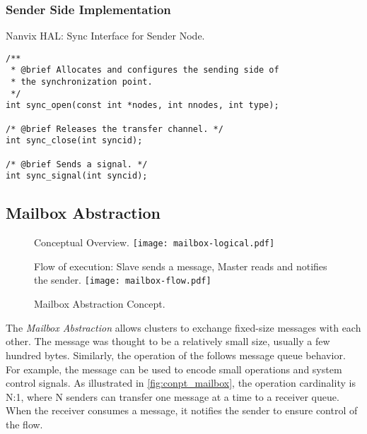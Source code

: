 			\subsubsection{Sender Side Implementation}


\begin{listing}[!tb]
\caption{Nanvix HAL: Sync Interface for Sender Node.}
\label{code:hal-sync-sender}
\begin{verbatim}
/**
 * @brief Allocates and configures the sending side of
 * the synchronization point.
 */
int sync_open(const int *nodes, int nnodes, int type);

/* @brief Releases the transfer channel. */
int sync_close(int syncid);

/* @brief Sends a signal. */
int sync_signal(int syncid);
\end{verbatim}
\end{listing}

		\subsection{Mailbox Abstraction}
		\label{sec.mailbox-abs}

			\begin{figure}[!tb]
				\centering%
				\caption{Mailbox Abstraction Concept.}%
				\label{fig:conpt_mailbox}%

					{Conceptual Overview.}%
					{\texttt{[image: mailbox-logical.pdf]}}%

				\hfill

					{Flow of execution: Slave sends a message, Master reads and notifies the sender.}%
					{\texttt{[image: mailbox-flow.pdf]}}%

			\end{figure}


			The \textit{Mailbox Abstraction} allows clusters to exchange fixed-size
			messages with each other.
			The message was thought to be a relatively small size, usually a few hundred bytes.
			Similarly, the operation of the \mailbox follows \posix message queue behavior.
			For example, the message can be used to encode small operations and system
			control signals.
			As illustrated in \autoref{fig:conpt_mailbox}, the operation cardinality is N:1,
			where N senders can transfer one message at a time to a receiver queue.
			When the receiver consumes a message, it notifies the sender to ensure
			control of the flow.

